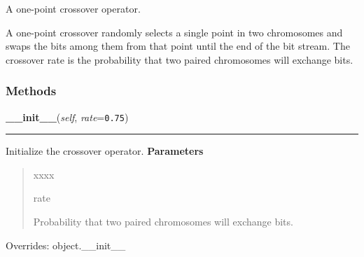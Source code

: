 A one-point crossover operator.

A one-point crossover randomly selects a single point in two chromosomes and
swaps the bits among them from that point until the end of the bit stream.
The crossover rate is the probability that two paired chromosomes will
exchange bits.


  \subsubsection{Methods}

    \vspace{0.5ex}

\hspace{.8\funcindent}\begin{boxedminipage}{\funcwidth}

    \raggedright \textbf{\_\_init\_\_}(\textit{self}, \textit{rate}={\tt 0.75})

    \vspace{-1.5ex}

    \rule{\textwidth}{0.5\fboxrule}
\setlength{\parskip}{2ex}

Initialize the crossover operator.
\setlength{\parskip}{1ex}
      \textbf{Parameters}
      \vspace{-1ex}

      \begin{quote}
        \begin{Ventry}{xxxx}

          \item[rate]


Probability that two paired chromosomes will exchange bits.
        \end{Ventry}

      \end{quote}

      Overrides: object.\_\_init\_\_

    \end{boxedminipage}

    \label{peach:ga:crossover:OnePoint:__call__}

